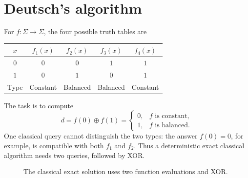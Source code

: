 \documentclass[11pt,oneside,openany]{book}
\theoremstyle{definition}
\begin{document}
\section{Deutsch's algorithm}
\label{sec:deutsch}
For $f:\Sigma\to\Sigma$, the four possible truth tables are
\begin{center}
\begin{tabular}{c|cccc}
 $x$ & $f_1(x)$ & $f_2(x)$ & $f_3(x)$ & $f_4(x)$\\ \hline
 $0$ & $0$ & $0$ & $1$ & $1$\\
 $1$ & $0$ & $1$ & $0$ & $1$\\ \hline
 Type & Constant & Balanced & Balanced & Constant
\end{tabular}
\end{center}
The task is to compute
\begin{equation}
 d=f(0)\oplus f(1)=
 \begin{cases}0,&f\text{ is constant},\\1,&f\text{ is balanced}.
 \end{cases}
 \label{eq:deutsch-answer}
\end{equation}
One classical query cannot distinguish the two types: the answer $f(0)=0$, for example, is compatible with both $f_1$ and $f_2$. Thus a deterministic exact classical algorithm needs two queries, followed by XOR.
\par
\begin{figure}[htbp]
\centering
{}
\caption{The classical exact solution uses two function evaluations and XOR.}
\label{fig:deutsch-classical}
\end{figure}
\par
\end{document}

